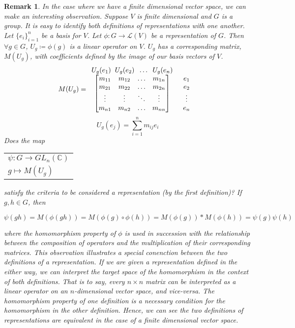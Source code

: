 \documentclass[10pt]{ucthesis}
\newtheorem{remark}[definition]{Remark}
\begin{document}
\begin{remark}
	In the case where we have a finite dimensional vector space, we can make an interesting observation. Suppose $V$ is finite dimensional and $G$ is a group. It is easy to identify both definitions of representations with one another. Let $\{e_i\}_{i=1}^n$ be a basis for $V$. Let $\phi : G \rightarrow \mathcal{L}(V)$ be a representation of $G$. Then $\forall g \in G$, $U_g\coloneq\phi(g)$ is a linear operator on $V$. $U_g$ has a corresponding matrix, $M(U_g)$, with coefficients defined by the image of our basis vectors of $V$.
$$M(U_g) = \begin{array}{c c}
			U_g(e_1) \hspace{2mm} U_g(e_2) \hspace{2mm} \hdots \hspace{2mm}  U_g(e_n) & \\
			\begin{bmatrix}
				m_{11} & m_{12} & \hdots & m_{1n}\\
				m_{21} & m_{22} & \hdots & m_{2n} \\
				\vdots & \vdots & \ddots & \vdots\\
				m_{n1} & m_{n2} & \hdots & m_{nn}\\
			\end{bmatrix}
			&
			\begin{array}{c}
				e_1\\
				e_2\\
				\vdots\\
				e_n\\
			\end{array}
		\end{array}$$
$$U_g(e_j) = \sum_{i=1}^n m_{ij}e_i$$
\renewcommand{\arraystretch}{0.5}
Does the map \begin{tabular}{l}
			$\psi:G\rightarrow GL_n(\mathbb{C})$\\
			\hspace{6mm}$g\mapsto M(U_g)$
       		 \end{tabular}
satisfy the criteria to be considered a representation (by the first definition)? If $g,h \in G$, then

	$$\psi(gh) = M(\phi(gh)) = M(\phi(g)\circ \phi(h)) = M(\phi(g))*M(\phi(h)) = \psi(g)\psi(h)$$

\noindent where the homomorphism property of $\phi$ is used in succession with the relationship between the composition of operators and the multiplication of their corresponding matrices. This observation illustrates a special conenction between the two definitions of a representation. If we are given a representation defined in the either way, we can interpret the target space of the homomorphism in the context of both definitions. That is to say, every $n\times n$ matrix can be interpreted as a linear operator on an $n$-dimensional vector space, and vice-versa. The homomorphism property of one definition is a necessary condition for the homomorphism in the other definition. Hence, we can see the two definitions of representations are equivalent in the case of a finite dimensional vector space.
\end{remark}
\end{document}
